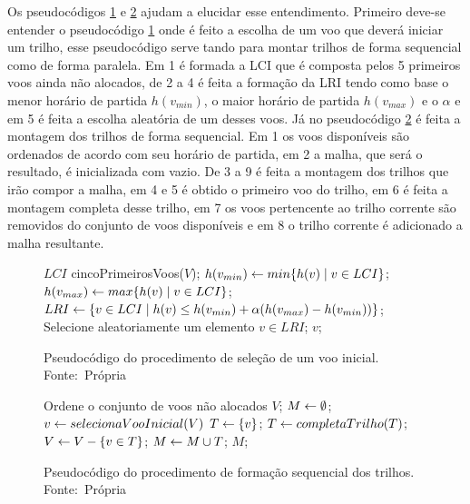 Os pseudocódigos \ref{alg:selectinit} e \ref{alg:formseq} ajudam a elucidar esse
entendimento. Primeiro deve-se entender o pseudocódigo \ref{alg:selectinit}
onde é feito a escolha de um voo que deverá iniciar um trilho, esse
pseudocódigo serve tando para montar trilhos de forma sequencial como de forma
paralela. Em 1 é formada a LCI que é composta pelos 5 primeiros voos ainda não
alocados, de 2 a 4 é feita a formação da LRI tendo como base o menor horário de
partida $h(v_{min})$, o maior horário de partida $h(v_{max})$ e o $\alpha$ e em
5 é feita a escolha aleatória de um desses voos. Já no pseudocódigo
\ref{alg:formseq} é feita a montagem dos trilhos de forma sequencial. Em 1 os
voos disponíveis são ordenados de acordo com seu horário de partida, em 2 a
malha, que será o resultado, é inicializada com vazio. De 3 a 9 é feita a
montagem dos trilhos que irão compor a malha, em 4 e 5 é obtido o primeiro voo
do trilho, em 6 é feita a montagem completa desse trilho, em 7 os voos
pertencente ao trilho corrente são removidos do conjunto de voos disponíveis e
em 8 o trilho corrente é adicionado a malha resultante.

 \begin{figure}[h]
\caption{Pseudocódigo do procedimento de seleção de um voo inicial. \newline
\mbox{Fonte: Própria}}\label{alg:selectinit}
\begin{programma}

\STATE $LCI$ \GETS cincoPrimeirosVoos($V$);
\STATE $h(v_{min}) \leftarrow min\{h(v) \mid v \in LCI\}$;
\STATE $h(v_{max}) \leftarrow max\{h(v) \mid v \in LCI\}$;
\STATE $LRI \leftarrow \{v \in LCI \mid h(v) \leq h(v_{min}) + \alpha(h(v_{max}) -
h(v_{min}))\}$;
\STATE Selecione aleatoriamente um elemento $v \in LRI$;
\STATE\RETURN $v$;
\ENDALGORITHM
\end{programma}
\end{figure}

\begin{figure}[h]
\caption{Pseudocódigo do procedimento de formação sequencial dos trilhos.
\newline
\mbox{Fonte: Própria}}\label{alg:formseq}
\begin{programma}

\STATE Ordene o conjunto de voos não alocados $V$;
\STATE $M \leftarrow \emptyset$;
\STATE $v \leftarrow selecionaVooInicial(V)$
\STATE $T \leftarrow \{v\}$;
\STATE $T \leftarrow completaTrilho(T)$;
\STATE $V \leftarrow V - \{v \in T\}$;
\STATE $M \leftarrow M \cup T$;
\ENDWHILE
\STATE\RETURN $M$;

\ENDALGORITHM
\end{programma}
\end{figure}


